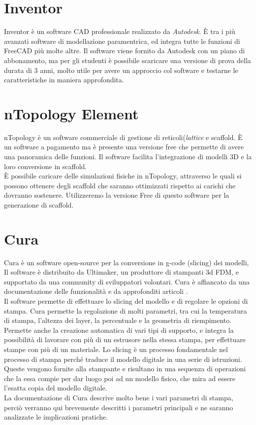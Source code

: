 \section{Inventor}
Inventor \parencite{Reference43} è un software CAD professionale realizzato da \emph{Autodesk}. È tra i più avanzati software di modellazione paramentrica, ed integra tutte le funzioni di FreeCAD più molte altre. Il software viene fornito da Autodesk con un piano di abbonamento, ma per gli studenti è possibile scaricare una versione di prova della durata di 3 anni, molto utile per avere un approccio col software e testarne le caratteristiche in maniera approfondita.

\section{nTopology Element}
nTopology \parencite{Reference139} è un software commerciale di gestione di reticoli(\emph{lattice} e scaffold. È un software a pagamento ma è presente una versione free che permette di avere una panoramica delle funzioni. Il software facilita l'integrazione di modelli 3D e la loro conversione in scaffold. \\ È possibile caricare delle simulazioni fisiche in nTopology, attraverso le quali si possono ottenere degli scaffold che saranno ottimizzati rispetto ai carichi che dovranno sostenere. Utilizzeremo la versione Free di questo software per la generazione di scaffold.

\section{Cura}
Cura \parencite{Reference44} è un software open-source per la conversione in g-code (slicing) dei modelli, Il software è distribuito da Ultimaker, un produttore di stampanti 3d FDM, e supportato da una community di sviluppatori volontari. Cura è affiancato da una documentazione delle funzionalità \parencite{Reference45} e da approfonditi articoli \parencite{Reference52}.\\
Il software permette di effettuare lo slicing del modello e di regolare le opzioni di stampa. Cura permette la regolazione di molti parametri, tra cui la temperatura di stampa, l'altezza dei layer, la percentuale e la geometria di riempimento. Permette anche la creazione automatica di vari tipi di supporto, e integra la possibilità di lavorare con più di un estrusore nella stessa stampa, per effettuare stampe con più di un materiale.
Lo slicing è un processo fondamentale nel processo di stampa perché traduce il modello digitale in una serie di istruzioni. Queste vengono fornite alla stampante e risultano in una sequenza di operazioni che la essa compie per dar luogo poi ad un modello fisico, che mira ad essere l'esatta copia del modello digitale.\\
La documentazione di Cura descrive molto bene i vari parametri di stampa, perciò verranno qui brevemente descritti i parametri principali e ne saranno analizzate le implicazioni pratiche.

